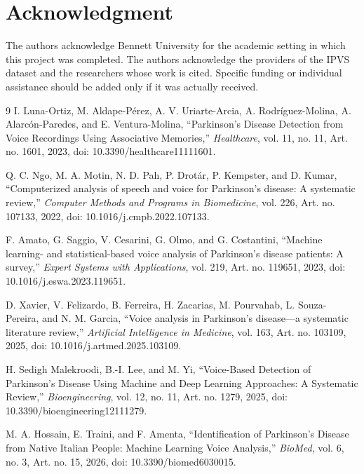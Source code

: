 \documentclass[conference]{IEEEtran}
\begin{document}
\section*{Acknowledgment}
The authors acknowledge Bennett University for the academic setting in which this project was completed. The authors acknowledge the providers of the IPVS dataset and the researchers whose work is cited. Specific funding or individual assistance should be added only if it was actually received.
\balance
\begin{thebibliography}{9}
\scriptsize
{}
I. Luna-Ortiz, M. Aldape-Pérez, A. V. Uriarte-Arcia, A. Rodríguez-Molina, A. Alarcón-Paredes, and E. Ventura-Molina, ``Parkinson's Disease Detection from Voice Recordings Using Associative Memories,'' \emph{Healthcare}, vol. 11, no. 11, Art. no. 1601, 2023, doi: 10.3390/healthcare11111601.

Q. C. Ngo, M. A. Motin, N. D. Pah, P. Drotár, P. Kempster, and D. Kumar, ``Computerized analysis of speech and voice for Parkinson's disease: A systematic review,'' \emph{Computer Methods and Programs in Biomedicine}, vol. 226, Art. no. 107133, 2022, doi: 10.1016/j.cmpb.2022.107133.

F. Amato, G. Saggio, V. Cesarini, G. Olmo, and G. Costantini, ``Machine learning- and statistical-based voice analysis of Parkinson's disease patients: A survey,'' \emph{Expert Systems with Applications}, vol. 219, Art. no. 119651, 2023, doi: 10.1016/j.eswa.2023.119651.

D. Xavier, V. Felizardo, B. Ferreira, H. Zacarias, M. Pourvahab, L. Souza-Pereira, and N. M. Garcia, ``Voice analysis in Parkinson's disease---a systematic literature review,'' \emph{Artificial Intelligence in Medicine}, vol. 163, Art. no. 103109, 2025, doi: 10.1016/j.artmed.2025.103109.

H. Sedigh Malekroodi, B.-I. Lee, and M. Yi, ``Voice-Based Detection of Parkinson's Disease Using Machine and Deep Learning Approaches: A Systematic Review,'' \emph{Bioengineering}, vol. 12, no. 11, Art. no. 1279, 2025, doi: 10.3390/bioengineering12111279.

M. A. Hossain, E. Traini, and F. Amenta, ``Identification of Parkinson's Disease from Native Italian People: Machine Learning Voice Analysis,'' \emph{BioMed}, vol. 6, no. 3, Art. no. 15, 2026, doi: 10.3390/biomed6030015.
\end{thebibliography}
\end{document}
